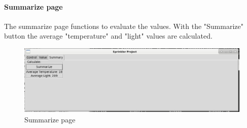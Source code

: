 \documentclass{article}
\begin{document}
\paragraph{Summarize page}
The summarize page functions to evaluate the values. With the "Summarize" button the average "temperature" and "light" values are calculated. 
\begin{figure}
     \centering
	\includegraphics[scale=0.3]{summarize_view.png}
	\caption{Summarize page}
	\label{fig:summarize}
\end{figure}
\end{document}
